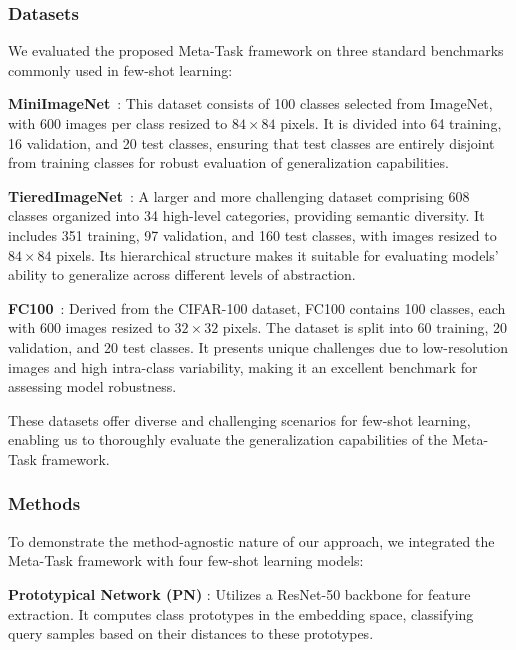 \subsubsection{Datasets}
  
We evaluated the proposed {Meta-Task} framework on three standard benchmarks commonly used in few-shot learning:

\noindent
\textbf{MiniImageNet}~\cite{mini-imagenet}: This dataset consists of 100 classes selected from ImageNet, with 600 images per class resized to $84 \times 84$ pixels. It is divided into 64 training, 16 validation, and 20 test classes, ensuring that test classes are entirely disjoint from training classes for robust evaluation of generalization capabilities.

\noindent
\textbf{TieredImageNet}~\cite{ren2018meta}: A larger and more challenging dataset comprising 608 classes organized into 34 high-level categories, providing semantic diversity. It includes 351 training, 97 validation, and 160 test classes, with images resized to $84 \times 84$ pixels. Its hierarchical structure makes it suitable for evaluating models' ability to generalize across different levels of abstraction.

\noindent
\textbf{FC100}~\cite{oreshkin2018tadam2}: Derived from the CIFAR-100 dataset, FC100 contains 100 classes, each with 600 images resized to $32 \times 32$ pixels. The dataset is split into 60 training, 20 validation, and 20 test classes. It presents unique challenges due to low-resolution images and high intra-class variability, making it an excellent benchmark for assessing model robustness.
  
These datasets offer diverse and challenging scenarios for few-shot learning, enabling us to thoroughly evaluate the generalization capabilities of the {Meta-Task} framework.
  
\subsubsection{Methods}
  
To demonstrate the method-agnostic nature of our approach, we integrated the {Meta-Task} framework with four few-shot learning models:

\noindent
\textbf{Prototypical Network (PN)} \cite{snell2017prototypical}: Utilizes a ResNet-50 \cite{resnet-code} backbone for feature extraction. It computes class prototypes in the embedding space, classifying query samples based on their distances to these prototypes.

